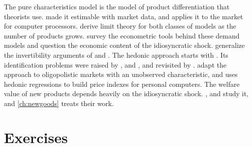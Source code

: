 The pure characteristics model is the model of product differentiation that theorists use. \citet{BerryPakes2007} made
it estimable with market data, and \citet{Song2007} applies it to the market for computer processors.
\citet{BerryLintonPakes2004} derive limit theory for both classes of models as the number of products grows.
\citet{AckerbergEtAl2007} survey the econometric tools behind these demand models and question the economic
content of the idiosyncratic shock.
\citet{BerryGandhiHaile2013} generalize the invertibility arguments of \citet{Berry1994} and \citet{BerryPakes2007}. The
hedonic approach starts with \citet{Rosen1974}. Its identification problems were raised by \citet{BrownRosen1982},
\citet{Epple1987} and \citet{Bartik1987}, and revisited by \citet{EkelandHeckmanNesheim2004}. \citet{BajariBenkard2005}
adapt the approach to oligopolistic markets with an unobserved characteristic, and \citet{Pakes2003} uses hedonic
regressions to build price indexes for personal computers. The welfare value of new products depends heavily on the
idiosyncratic shock. \citet{Trajtenberg1989}, \citet{Hausman1997} and \citet{Petrin2002} study it, and
\cref{ch:newgoods} treats their work.

\section{Exercises}\label{sec:06-exercises}

